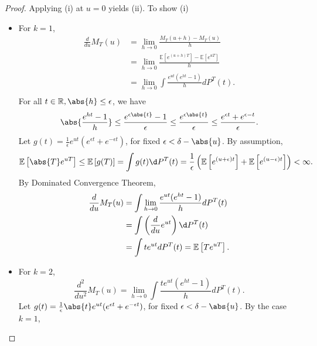 \documentclass[a4paper]{article}
\begin{document}
\begin{proof}
	Applying (i) at $u = 0$ yields (ii). To show (i)
	\begin{itemize}
		\item For $k = 1$,
		\begin{equation*}
			\begin{aligned}
				\frac{d}{du}M_T(u) &= \lim\limits_{h \to 0} \frac{M_T(u+h) - M_T(u)}{h} \\
				&= \lim\limits_{h \to 0} \frac{\mathbb{E}\left[e^{(u+h)T}\right] - \mathbb{E}\left[e^{uT}\right]}{h} \\
				&= \lim\limits_{h \to 0} \int \frac{e^{ut}(e^{ht}-1)}{h}dP^T(t). \\
			\end{aligned}
		\end{equation*}
		For all  $t \in\mathbb{R}, \abs{h} \leq \epsilon$, we have
		\begin{equation*}
			\abs{\frac{e^{ht}-1}{h}} \leq \frac{e^{\epsilon\abs{t}}-1}{\epsilon} \leq \frac{e^{\epsilon\abs{t}}}{\epsilon} \leq \frac{e^{\epsilon t} + e^{\epsilon -t}}{\epsilon}.
		\end{equation*}
		Let $g(t) = \frac{1}{\epsilon} e^{ut}(e^{\epsilon t}+e^{-\epsilon t})$, for fixed $\epsilon < \delta - \abs{u}$. By assumption,
		\begin{equation*}
			\mathbb{E}\left[\abs{T}e^{uT}\right] \leq \mathbb{E}\left[g(T)\right] = \int g(t) \d P^T(t) = \frac{1}{\epsilon}\left(\mathbb{E}\left[e^{(u+\epsilon) t}\right]+\mathbb{E}\left[e^{(u-\epsilon) t}\right]\right) < \infty.
		\end{equation*}
		By Dominated Convergence Theorem, 
		\begin{equation*}
			\begin{aligned}
				\frac{d}{du}M_T(u) &= \int \lim\limits_{h \to 0} \frac{e^{ut}(e^{ht}-1)}{h}dP^T(t) \\
				&= \int \left(\frac{d}{du} e^{ut}\right)\d P^T(t) \\
				&= \int t e^{ut} d P^T(t) = \mathbb{E}\left[Te^{uT}\right].
			\end{aligned}
		\end{equation*}
		\item For $k = 2$,
		\begin{equation*}
			\frac{d^2}{du^2}M_T(u) = \lim\limits_{h \to 0} \int \frac{te^{ut}(e^{ht}-1)}{h}dP^T(t).
		\end{equation*}
		Let $g(t) = \frac{1}{\epsilon} \abs{t} e^{ut}(e^{\epsilon t}+e^{-\epsilon t})$, for fixed $\epsilon < \delta - \abs{u}$. By the case $k = 1$,

\end{itemize}
\end{proof}
\end{document}
